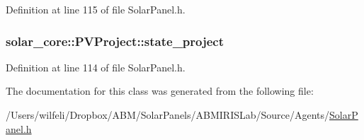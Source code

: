 Definition at line 115 of file Solar\+Panel.\+h.

\hypertarget{classsolar__core_1_1_p_v_project_ab25a22c1202f2314a55dc9a759922183}{}
\subsubsection[{state\+\_\+project}]{ solar\+\_\+core\+::\+P\+V\+Project\+::state\+\_\+project}\label{classsolar__core_1_1_p_v_project_ab25a22c1202f2314a55dc9a759922183}


Definition at line 114 of file Solar\+Panel.\+h.



The documentation for this class was generated from the following file\+:\begin{DoxyCompactItemize}
\item 
/\+Users/wilfeli/\+Dropbox/\+A\+B\+M/\+Solar\+Panels/\+A\+B\+M\+I\+R\+I\+S\+Lab/\+Source/\+Agents/\hyperlink{_solar_panel_8h}{Solar\+Panel.\+h}\end{DoxyCompactItemize}
